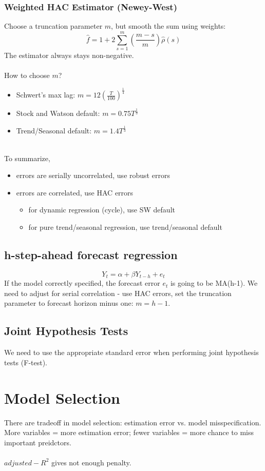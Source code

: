 \documentclass{article}
\begin{document}
\subsubsection{Weighted HAC Estimator (Newey-West)}
Choose a truncation parameter $m$, but smooth the sum using weights:
$$\hat{f} = 1 + 2\sum_{s=1}^m (\frac{m-s}{m}) \hat{\rho} (s)$$
The estimator always stays non-negative.\\
\\
How to choose $m$?
\begin{itemize}
    \item Schwert's max lag: $m = 12(\frac{T}{100})^\frac{1}{4}$
    \item Stock and Watson default: $m = 0.75 T^\frac{1}{3}$
    \item Trend/Seasonal default: $m = 1.4T^\frac{1}{3}$
\end{itemize}
\\
To summarize, 
\begin{itemize}
    \item errors are serially uncorrelated, use robust errors
    \item errors are correlated, use HAC errors
    \begin{itemize}
        \item for dynamic regression (cycle), use SW default
        \item for pure trend/seasonal regression, use trend/seasonal default
    \end{itemize}
\end{itemize}

\subsection{h-step-ahead forecast regression}
$$Y_t = \alpha + \beta Y_{t-h} + e_t$$
If the model correctly specified, the forecast error $e_t$ is going to be MA(h-1). We need to adjust for serial correlation - use HAC errors, set the truncation parameter to forecast horizon minus one: $m=h-1$.

\subsection{Joint Hypothesis Tests}
We need to use the appropriate standard error when performing joint hypothesis tests (F-test).


\section{Model Selection}
There are tradeoff in model selection: estimation error vs. model misspecification. More variables = more estimation error; fewer variables = more chance to miss important preidctors.\\
\\
$adjusted-R^2$ gives not enough penalty.\\
\end{document}
